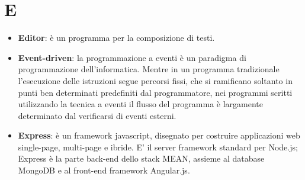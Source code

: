 \section{E}
\begin{itemize}
	\item
	\textbf{Editor}: è un programma per la composizione di testi.
	\item
	\textbf{Event-driven}: la programmazione a eventi è un paradigma di programmazione dell'informatica. Mentre in un programma tradizionale l'esecuzione delle istruzioni segue percorsi fissi, che si ramificano soltanto in punti ben determinati predefiniti dal programmatore, nei programmi scritti utilizzando la tecnica a eventi il flusso del programma è largamente determinato dal verificarsi di eventi esterni.
	\item
	\textbf{Express}: è un framework javascript, disegnato per costruire applicazioni web single-page, multi-page e ibride. E' il server framework standard per Node.js; Express è la parte back-end dello stack MEAN, assieme al database MongoDB e al front-end framework Angular.js.
\end{itemize}
